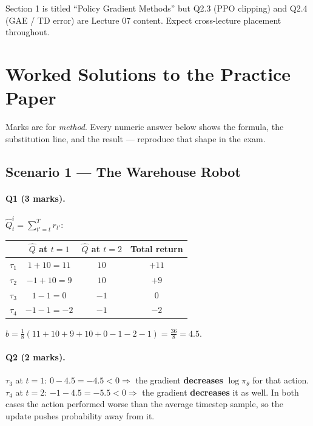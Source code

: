 \documentclass[11pt,a4paper]{article}
\begin{document}
Section 1 is titled ``Policy Gradient Methods'' but Q2.3 (PPO clipping) and
Q2.4 (GAE / TD error) are Lecture 07 content. Expect cross-lecture
placement throughout.

\newpage
\section{Worked Solutions to the Practice Paper}

Marks are for \emph{method}. Every numeric answer below shows the formula, the
substitution line, and the result --- reproduce that shape in the exam.

\subsection{Scenario 1 --- The Warehouse Robot}

\paragraph{Q1 (3 marks).} $\hat Q^i_t=\sum_{t'=t}^{T}r_{t'}$:
\begin{center}
\begin{tabular}{@{}lccc@{}}
\toprule
& $\hat Q$ at $t=1$ & $\hat Q$ at $t=2$ & Total return \\
\midrule
$\tau_1$ & $1+10=11$ & $10$ & $+11$\\
$\tau_2$ & $-1+10=9$ & $10$ & $+9$\\
$\tau_3$ & $1-1=0$ & $-1$ & $0$\\
$\tau_4$ & $-1-1=-2$ & $-1$ & $-2$\\
\bottomrule
\end{tabular}
\end{center}
$b=\frac{1}{8}(11+10+9+10+0-1-2-1)=\frac{36}{8}=\mathbf{4.5}$.

\paragraph{Q2 (2 marks).}
$\tau_3$ at $t=1$: $0-4.5=\mathbf{-4.5}<0 \Rightarrow$ the gradient
\textbf{decreases} $\log\pi_\theta$ for that action.
$\tau_4$ at $t=2$: $-1-4.5=\mathbf{-5.5}<0 \Rightarrow$ the gradient
\textbf{decreases} it as well. In both cases the action performed worse than
the average timestep sample, so the update pushes probability away from it.
\end{document}
